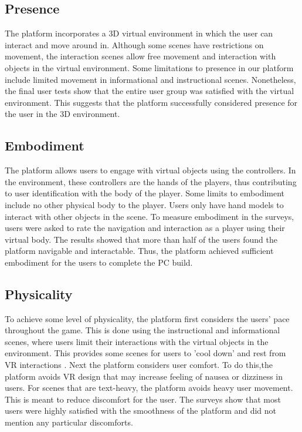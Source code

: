 \documentclass[10pt,twocolumn]{article}
\begin{document}
\subsection{Presence}

\par The platform incorporates a 3D virtual environment in which the user can interact and move around in. Although some scenes have restrictions on movement, the interaction scenes allow free movement and interaction with objects in the virtual environment. Some limitations to presence in our platform include limited movement in informational and instructional scenes. Nonetheless, the final user tests show that the entire user group was satisfied with the virtual environment. This suggests that the platform successfully considered presence for the user in the 3D environment. 

\subsection{Embodiment}

\par The platform allows users to engage with virtual objects using the controllers. In the environment, these controllers are the hands of the players, thus contributing to user identification with the body of the player. Some limits to embodiment include no other physical body to the player. Users only have hand models to interact with other objects in the scene. To measure embodiment in the surveys, users were asked to rate the navigation and interaction as a player using their virtual body. The results showed that more than half of the users found the platform navigable and interactable. Thus, the platform achieved sufficient embodiment for the users to complete the PC build. 

\subsection{Physicality}

\par To achieve some level of physicality, the platform first considers the users’ pace throughout the game. This is done using the instructional and informational scenes, where users limit their interactions with the virtual objects in the environment. This provides some scenes for users to 'cool down' and rest from VR interactions \cite{Desurvire2018DesignUserExperience}. Next the platform considers user comfort. To do this,the platform avoids VR design that may increase feeling of nausea or dizziness in users. For scenes that are text-heavy, the platform avoids heavy user movement. This is meant to reduce discomfort for the user. The surveys show that most users were highly satisfied with the smoothness of the platform and did not mention any particular discomforts. 
\end{document}
